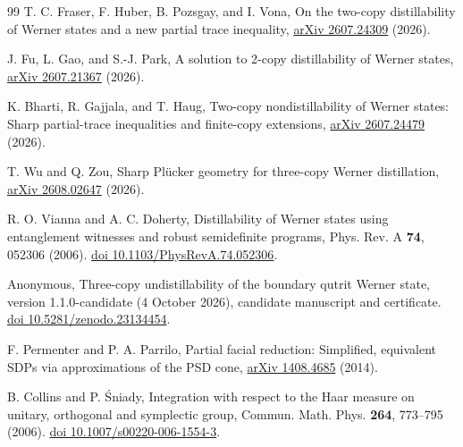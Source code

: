 \documentclass[aps,pra,reprint,superscriptaddress,amsmath,amssymb,floatfix,nofootinbib]{revtex4-2}
\begin{document}
\begin{thebibliography}{99}
T. C. Fraser, F. Huber, B. Pozsgay, and I. Vona,
On the two-copy distillability of Werner states and a new partial trace inequality,
\href{https://arxiv.org/abs/2607.24309}{arXiv 2607.24309} (2026).

J. Fu, L. Gao, and S.-J. Park,
A solution to 2-copy distillability of Werner states,
\href{https://arxiv.org/abs/2607.21367}{arXiv 2607.21367} (2026).

K. Bharti, R. Gajjala, and T. Haug,
Two-copy nondistillability of Werner states:
Sharp partial-trace inequalities and finite-copy extensions,
\href{https://arxiv.org/abs/2607.24479}{arXiv 2607.24479} (2026).

T. Wu and Q. Zou,
Sharp Pl\"ucker geometry for three-copy Werner distillation,
\href{https://arxiv.org/abs/2608.02647}{arXiv 2608.02647} (2026).

R. O. Vianna and A. C. Doherty,
Distillability of Werner states using entanglement witnesses and robust
semidefinite programs,
Phys. Rev. A \textbf{74}, 052306 (2006).
\href{https://doi.org/10.1103/PhysRevA.74.052306}{doi 10.1103/PhysRevA.74.052306}.

Anonymous,
Three-copy undistillability of the boundary qutrit Werner state,
version 1.1.0-candidate (4 October 2026), candidate manuscript and certificate.
\href{https://doi.org/10.5281/zenodo.23134454}{doi 10.5281/zenodo.23134454}.

F. Permenter and P. A. Parrilo,
Partial facial reduction: Simplified, equivalent SDPs via approximations
of the PSD cone,
\href{https://arxiv.org/abs/1408.4685}{arXiv 1408.4685} (2014).

B. Collins and P. \'Sniady,
Integration with respect to the Haar measure on unitary, orthogonal and
symplectic group,
Commun. Math. Phys. \textbf{264}, 773--795 (2006).
\href{https://doi.org/10.1007/s00220-006-1554-3}{doi 10.1007/s00220-006-1554-3}.

\end{thebibliography}
\end{document}
